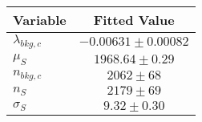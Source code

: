 \begin{tabular}[t]{lc}
\hline
Variable &Fitted Value\\
\hline\hline
$\lambda_{bkg,c}$&$-0.00631\pm0.00082$\\
\hline
$\mu_{S}$&$1968.64\pm0.29$\\
\hline
$n_{bkg,c}$&$2062\pm68$\\
\hline
$n_{S}$&$2179\pm69$\\
\hline
$\sigma_{S}$&$9.32\pm0.30$\\
\hline
\end{tabular}